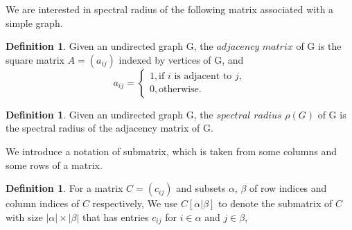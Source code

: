 \documentclass{beamer}
\theoremstyle{plain}
\theoremstyle{definition}
\newtheorem{defn}[thm]{Definition}
\begin{document}
\begin{frame}

    We are interested in spectral radius of the following matrix associated with a simple graph.

    \begin{defn}
    Given an undirected graph G, the$\textit{ adjacency matrix}$ of G is the square matrix $A = (a_{ij})$ indexed by vertices of G, and
    \[a_{ij} =\begin{cases}
    1, \text{if $i$ is adjacent to $j$}, \\
    0, \text{otherwise.}
    \end{cases}
    \]
    \end{defn}
    
    \begin{defn}
    Given an undirected graph G, the $\textit{spectral radius}$  $\rho(G) $ of G is the spectral radius of the adjacency matrix of G.
    \end{defn}

\end{frame}

\begin{frame}
    We introduce a notation of submatrix, which is taken from some columns and some rows of a matrix.
    \begin{defn}
        For a matrix $C=(c_{ij})$ and subsets $\alpha$, $\beta$ of row indices and column indices of 
        $C$ respectively,  We use $C[\alpha|\beta]$ to denote the submatrix of $C$ with size
         $ |\alpha| \times |\beta| $ that has entries $c_{ij}$ for $i\in \alpha$ and $j\in\beta$,
    \end{defn}

\end{frame}
\end{document}
